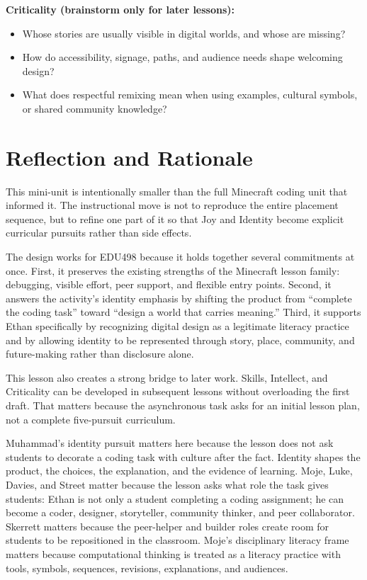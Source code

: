 \documentclass[11pt]{article}
\begin{document}
\textbf{Criticality (brainstorm only for later lessons):}
\begin{itemize}[leftmargin=*]
    \item Whose stories are usually visible in digital worlds, and whose are missing?
    \item How do accessibility, signage, paths, and audience needs shape welcoming design?
    \item What does respectful remixing mean when using examples, cultural symbols, or shared community knowledge?
\end{itemize}

\section*{Reflection and Rationale}

This mini-unit is intentionally smaller than the full Minecraft coding unit that informed it. The instructional move is not to reproduce the entire placement sequence, but to refine one part of it so that Joy and Identity become explicit curricular pursuits rather than side effects.

The design works for EDU498 because it holds together several commitments at once. First, it preserves the existing strengths of the Minecraft lesson family: debugging, visible effort, peer support, and flexible entry points. Second, it answers the activity's identity emphasis by shifting the product from ``complete the coding task'' toward ``design a world that carries meaning.'' Third, it supports Ethan specifically by recognizing digital design as a legitimate literacy practice and by allowing identity to be represented through story, place, community, and future-making rather than disclosure alone.

This lesson also creates a strong bridge to later work. Skills, Intellect, and Criticality can be developed in subsequent lessons without overloading the first draft. That matters because the asynchronous task asks for an initial lesson plan, not a complete five-pursuit curriculum.

Muhammad's identity pursuit matters here because the lesson does not ask students to decorate a coding task with culture after the fact. Identity shapes the product, the choices, the explanation, and the evidence of learning. Moje, Luke, Davies, and Street matter because the lesson asks what role the task gives students: Ethan is not only a student completing a coding assignment; he can become a coder, designer, storyteller, community thinker, and peer collaborator. Skerrett matters because the peer-helper and builder roles create room for students to be repositioned in the classroom. Moje's disciplinary literacy frame matters because computational thinking is treated as a literacy practice with tools, symbols, sequences, revisions, explanations, and audiences.
\end{document}
